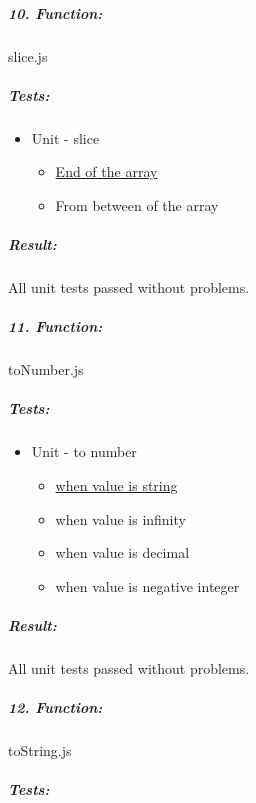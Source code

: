 \documentclass[a4paper, 12pt]{article}
\begin{document}
		\hypertarget{header-n472}{%
		\subparagraph{10. Function:}\label{header-n472}}
		
		slice.js
		
		\hypertarget{header-n474}{%
		\subparagraph{Tests:}\label{header-n474}}
		
		\begin{itemize}
		\item
		Unit - slice
		
		\begin{itemize}
			\item
			\underline{End of the array}
			\item
			From between of the array
		\end{itemize}
		\end{itemize}
		
		\hypertarget{header-n487}{%
		\subparagraph{Result:}\label{header-n487}}
		
		All unit tests passed without problems.



		\hypertarget{header-n515}{%
		\subparagraph{11. Function:}\label{header-n515}}
		
		toNumber.js
		
		\hypertarget{header-n517}{%
		\subparagraph{Tests:}\label{header-n517}}
		
		\begin{itemize}
		\item
		Unit - to number
		
		\begin{itemize}
			\item
			\underline{when value is string}
			\item
			when value is infinity
			\item
			when value is decimal
			\item
			when value is negative integer
		\end{itemize}
		\end{itemize}
		
		\hypertarget{header-n526}{%
		\subparagraph{Result:}\label{header-n526}}
		
		All unit tests passed without problems.



		\hypertarget{header-n558}{%
		\subparagraph{12. Function:}\label{header-n558}}
		
		toString.js
		
		\hypertarget{header-n560}{%
		\subparagraph{Tests:}\label{header-n560}}
		
\end{document}
